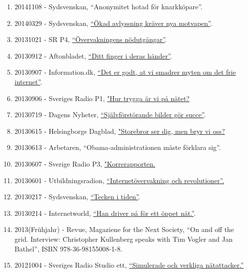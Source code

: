 \documentclass[
]{article}
\begin{document}
\begin{enumerate}
{  senaste offret för Kinas nätcensur''}.
\item
  20141108 - Sydsvenskan, ``Anonymitet hotad för knarkköpare''.
\item
  20140329 - Sydsvenskan,
  \href{http://www.sydsvenskan.se/2014-03-29/okad-avlyssning-kraver-nya-motvapen}{``Ökad
  avlyssning kräver nya motvapen''}.
\item
  20131021 - SR P4, \href{http://t.sr.se/NC8sUF}{``Övervakningens
  nödutgångar''}.
\item
  20130912 - Aftonbladet,
  \href{http://www.aftonbladet.se/nyheter/vetmer/article17455373.ab}{``Ditt
  finger i deras händer''}.
\item
  20130907 - Information.dk,
  \href{http://www.information.dk/471440}{``Det er godt, at vi smadrer
  myten om det frie internet''}.
\item
  20130906 - Sveriges Radio P1, \href{http://t.sr.se/OfP0gG}{"Hur trygga
  är vi på nätet?}
\item
  20130719 - Dagens Nyheter,
  \href{http://www.dn.se/kultur-noje/sjalvforstorande-bilder-gor-succe/}{``Självförstörande
  bilder gör succe''}.
\item
  20130615 - Helsingborgs Dagblad,
  \href{http://www.hd.se/2013-06-15/storebror-ser-dig1.\%20Kullenberg,\%20C.\%20men-bryr-vi-oss}{"Storebror
  ser dig, men bryr vi oss?}
\item
  20130613 - Arbetaren, ``Obama-administrationen måste förklara sig''.
\item
  20130607 - Sverige Radio P3,
  \href{http://t.sr.se/MiZb35}{"Korrerapporten.}
\item
  20130601 - Utbildningsradion,
  \href{http://urskola.se/Produkter/176858-UR-Samtiden-Overvakning-och-kontroll-Internetovervakning-och-revolutioner}{``Internetövervakning
  och revolutioner''.}
\item
  20130217 - Sydsvenskan,
  \href{http://www.sydsvenskan.se/2013-02-17/tecken-i-tiden}{``Tecken i
  tiden''}.
\item
  20130214 - Internetworld,
  \href{http://www.idg.se/2.1085/1.492033/han-driver-pa-for-ett-oppet-nat}{``Han
  driver på för ett öppet nät.''}.
\item
  2013(Frühjahr) - Revue, Magaziene for the Next Society, ``On and off
  the grid. Interview: Christopher Kullenberg speaks with Tim Vogler and
  Jan Bathel'', ISBN 978-36-98155008-1-8.
\item
  20121004 - Sveriges Radio Studio ett,
  \href{http://t.sr.se/1foOdCK}{``Simulerade och verkliga
  nätattacker.''}

\end{enumerate}
\end{document}
